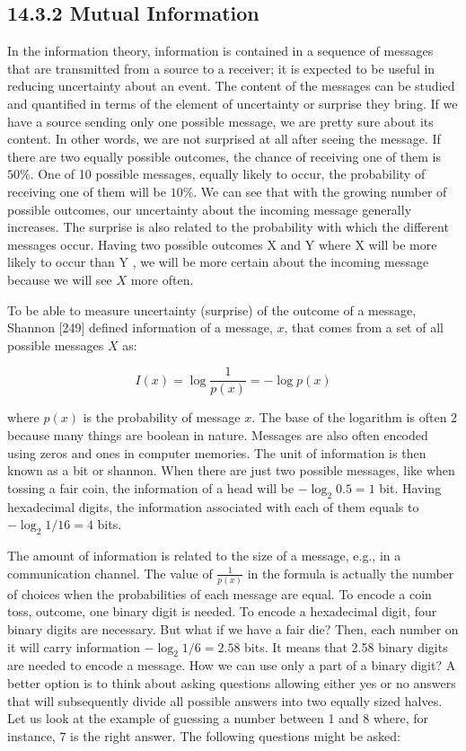 \documentclass[10pt]{book}
\begin{document}
\subsection*{14.3.2 Mutual Information}
In the information theory, information is contained in a sequence of messages that are transmitted from a source to a receiver; it is expected to be useful in reducing uncertainty about an event. The content of the messages can be studied and quantified in terms of the element of uncertainty or surprise they bring. If we have a source sending only one possible message, we are pretty sure about its content. In other words, we are not surprised at all after seeing the message. If there are two equally possible outcomes, the chance of receiving one of them is $50 \%$. One of 10 possible messages, equally likely to occur, the probability of receiving one of them will be $10 \%$. We can see that with the growing number of possible outcomes, our uncertainty about the incoming message generally increases. The surprise is also related to the probability with which the different messages occur. Having two possible outcomes X and Y where X will be more likely to occur than Y , we will be more certain about the incoming message because we will see $X$ more often.

To be able to measure uncertainty (surprise) of the outcome of a message, Shannon [249] defined information of a message, $x$, that comes from a set of all possible messages $X$ as:


\begin{equation*}
I(x)=\log \frac{1}{p(x)}=-\log p(x) \tag{14.5}
\end{equation*}


where $p(x)$ is the probability of message $x$. The base of the logarithm is often 2 because many things are boolean in nature. Messages are also often encoded using zeros and ones in computer memories. The unit of information is then known as a bit or shannon. When there are just two possible messages, like when tossing a fair coin, the information of a head will be $-\log _{2} 0.5=1$ bit. Having hexadecimal digits, the information associated with each of them equals to $-\log _{2} 1 / 16=4$ bits.

The amount of information is related to the size of a message, e.g., in a communication channel. The value of $\frac{1}{p(x)}$ in the formula is actually the number of choices when the probabilities of each message are equal. To encode a coin toss, outcome, one binary digit is needed. To encode a hexadecimal digit, four binary digits are necessary. But what if we have a fair die? Then, each number on it will carry information $-\log _{2} 1 / 6=2.58$ bits. It means that 2.58 binary digits are needed to encode a message. How we can use only a part of a binary digit? A better option is to think about asking questions allowing either yes or no answers that will subsequently divide all possible answers into two equally sized halves. Let us look at the example of guessing a number between 1 and 8 where, for instance, 7 is the right answer. The following questions might be asked:
\end{document}
